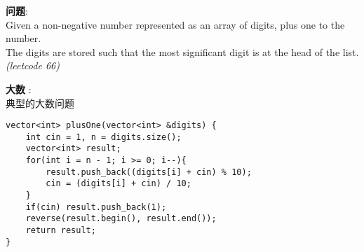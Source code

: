     
\begin{description}
    \item{\textbf{问题}}:\\
Given a non-negative number represented as an array of digits, plus one to the number.\\
The digits are stored such that the most significant digit is at the head of the list.\\
\textit{(leetcode 66)}
    \item{\textbf{大数}} : 
    \\典型的大数问题
    \begin{lstlisting}
vector<int> plusOne(vector<int> &digits) {
	int cin = 1, n = digits.size();
	vector<int> result;
	for(int i = n - 1; i >= 0; i--){
		result.push_back((digits[i] + cin) % 10);
		cin = (digits[i] + cin) / 10;
	}
	if(cin) result.push_back(1);
	reverse(result.begin(), result.end());
	return result;
}
    \end{lstlisting}
\end{description}
